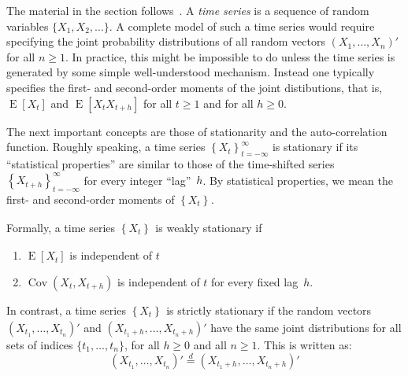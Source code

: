 \documentclass[11pt,a4]{article}
\DeclareMathOperator{\cov}{Cov}
\DeclareMathOperator{\E}{E}
\newcommand{\ts}[3]{\ensuremath{\left \{ #1 \right \}_{#2}^{#3}}}
\newcommand{\eqd}{\ensuremath{\stackrel{d}{=}}}
\theoremstyle{definition}
\begin{document}
The material in the section follows~\cite{BroDav}. A \emph{time series} is a
sequence of random variables $\{X_1, X_2, \ldots \}$. A complete model of such
a time series would require specifying the joint probability distributions of
all random vectors $(X_1, \ldots, X_n)'$ for all $n \geq 1$. In practice, this
might be impossible to do unless the time series is generated by some simple
well-understood mechanism. Instead one typically specifies the first- and
second-order moments of the joint distibutions, that is, $\E[X_t]$ and $\E[X_t
X_{t + h}]$ for all $t \geq 1$ and for all $h \geq 0$. 

The next important concepts are those of stationarity and the auto-correlation
function. Roughly speaking, a time series $\ts{X_t}{t = -\infty}{\infty}$ is
stationary if its ``statistical properties'' are similar to those of the
time-shifted series $\ts{X_{t + h}}{t = -\infty}{\infty}$ for every integer
``lag''~$h$. By statistical properties, we mean the first- and second-order
moments of $\ts{X_t}{}{}$. 

Formally, a time series $\ts{X_t}{}{}$ is weakly stationary if 
\begin{enumerate}
	\item $\E[X_t]$ is independent of $t$
	\item $\cov(X_t, X_{t + h})$ is independent of $t$ for every fixed lag~$h$.
\end{enumerate} 
In contrast, a time series $\ts{X_t}{}{}$ is strictly stationary if the random
vectors $(X_{t_1}, \ldots, X_{t_n})'$ and $(X_{t_1 + h}, \ldots, X_{t_n + h})'$
have the same joint distributions for all sets of indices $\{t_1, \ldots,
t_n\}$, for all $h \geq 0$ and all $n \geq 1$. This is written as:
\[
(X_{t_1}, \ldots, X_{t_n})' \eqd (X_{t_1 + h}, \ldots, X_{t_n + h})'
\] 
\end{document}

